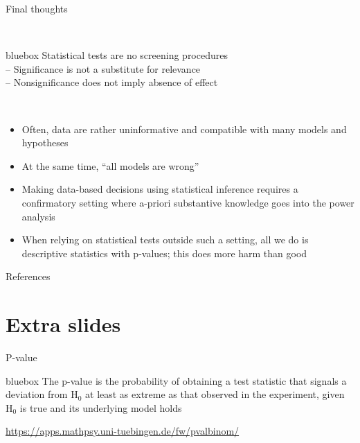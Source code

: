 \documentclass[aspectratio=169]{beamer}
\newenvironment{colbox}[1][\textwidth]%
  {\begin{beamercolorbox}[wd=#1, rounded=true, shadow=true]{bluebox}}
  {\end{beamercolorbox}}
\begin{document}
\begin{frame}{Final thoughts}

~\hfill\begin{colbox}[10cm]
Statistical tests are no screening procedures\\[1ex]
-- Significance is not a substitute for relevance\\
-- Nonsignificance does not imply absence of effect
\end{colbox}\hfill~

\vspace{2ex}

\begin{itemize}
\item Often, data are rather uninformative and compatible with many models and
hypotheses\\[1ex]

\item At the same time, ``all models are wrong'' \citep{Box76}\\[1ex]

\item Making data-based decisions using statistical inference requires a
confirmatory setting where a-priori substantive knowledge goes into the power
analysis\\[1ex]

\item When relying on statistical tests outside such a setting, all we do is
descriptive statistics with p-values; this does more harm than good
\end{itemize}

\end{frame}



\appendix
\begin{frame}[allowframebreaks]{References}
\renewcommand{\bibfont}{\footnotesize}


\end{frame}


\section{Extra slides}


\begin{frame}{P-value}

\begin{colbox}
The p-value is the probability of obtaining a test statistic that signals a
deviation from H$_0$ at least as extreme as that observed in the experiment,
given H$_0$ is true and its underlying model holds
\end{colbox}

\vspace{2ex}
\url{https://apps.mathpsy.uni-tuebingen.de/fw/pvalbinom/}

\end{frame}
\end{document}
